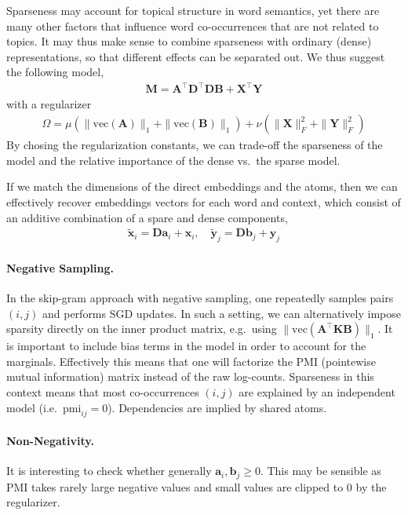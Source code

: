 \documentclass{article}
\newcommand{\x}{{\mathbf x}}
\newcommand{\valpha}{{\boldsymbol a}}
\newcommand{\vbeta}{{\boldsymbol b}}
\newcommand{\y}{{\mathbf y}}
\newcommand{\mM}{{\mathbf M}}
\newcommand{\mK}{{\mathbf K}}
\newcommand{\mD}{{\mathbf D}}
\newcommand{\mA}{{\mathbf A}}
\newcommand{\mB}{{\mathbf B}}
\newcommand{\mX}{{\mathbf X}}
\newcommand{\mY}{{\mathbf Y}}
\begin{document}
Sparseness may account for topical structure in word semantics, yet there are many other factors that influence word co-occurrences that are not related to topics. It may thus make sense to combine sparseness with ordinary (dense) representations, so that different effects can be separated out.  We thus suggest the following model,
\begin{align}
\mM = \mA^\top \mD^\top \mD \mB  + \mX^\top \mY
\end{align}
with a regularizer 
\begin{align}
\Omega = \mu \left( \| \text{vec}(\mA) \|_1 + \| \text{vec}(\mB) \|_1 \right) + \nu \left( \| \mX\|_F^2 + \| \mY\|_F^2 \right)
\end{align}
By chosing the regularization constants, we can trade-off the sparseness of the model and the relative importance of the dense vs.~the sparse model. 

If we match the dimensions of the direct embeddings and the atoms, then we can effectively recover embeddings vectors for each word and context, which consist of an additive combination of a spare and dense components,
\begin{align}
\tilde \x_i = \mD \valpha_i + \x_i, \quad \tilde \y_j = \mD \vbeta_j + \y_j 
\end{align}

\paragraph{Negative Sampling.} In the skip-gram approach with negative sampling, one repeatedly samples pairs $(i,j)$ and performs SGD updates. In such a setting, we can alternatively impose sparsity directly on the inner product matrix, e.g.~using $\|\text{vec}(\mA^\top \mK \mB)\|_1$. It is important to include bias terms in the model in order to account for the marginals. Effectively this means that one will factorize the PMI (pointewise mutual information) matrix instead of the raw log-counts. Sparseness in this context means that most co-occurrences $(i,j)$ are explained by an independent model (i.e.~$\text{pmi}_{ij}=0$). Dependencies are implied by shared atoms. 

\paragraph{Non-Negativity.} It is interesting to check whether generally $\valpha_i, \vbeta_j \geq 0$.  This may be sensible as PMI takes rarely large negative values and small values are clipped to $0$ by the regularizer. 
\end{document}
